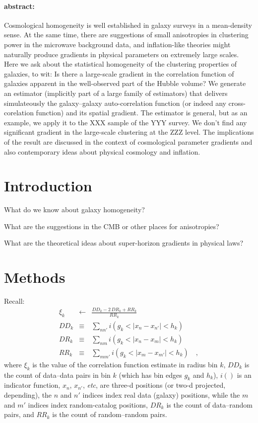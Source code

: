 \documentclass[12pt, letterpaper]{article}
\newcommand{\foreign}[1]{\textsl{#1}}
\newcommand{\etc}{\foreign{etc}}
\begin{document}
\paragraph{abstract:}
Cosmological homogeneity is well established in galaxy surveys in a mean-density
sense.
At the same time, there are suggestions of small anisotropies in clustering power in
the microwave background data, and inflation-like theories might naturally produce
gradients in physical parameters on extremely large scales.
Here we ask about the statistical homogeneity of the clustering properties of galaxies,
to wit:
Is there a large-scale gradient in the correlation function of galaxies
apparent in the well-observed part of the Hubble volume?
We generate an estimator (implicitly part of a large family of estimators)
that delivers simulateously the galaxy--galaxy auto-correlation function
(or indeed any cross-corelation function)
and its spatial gradient.
The estimator is general, but as an example,
we apply it to the XXX sample of the YYY survey.
We don't find any significant gradient in the large-scale clustering at the ZZZ level.
The implications of the result are discussed in the context of cosmological parameter
gradients and also contemporary ideas about physical cosmology and inflation.

\section{Introduction}

What do we know about galaxy homogeneity?

What are the suggestions in the CMB or other places for anisotropies?

What are the theoretical ideas about super-horizon gradients in physical laws?

\section{Methods}

Recall:
\begin{eqnarray}\displaystyle
\xi_k &\leftarrow& \frac{DD_k - 2\,DR_k + RR_k}{RR_k}
\\
DD_k &\equiv& \sum_{n n'} i(g_k < |x_n - x_{n'}| < h_k)
\\
DR_k &\equiv& \sum_{n m} i(g_k < |x_n - x_m| < h_k)
\\
RR_k &\equiv& \sum_{m m'} i(g_k < |x_m - x_{m'}| < h_k)
\quad ,
\end{eqnarray}
where
$\xi_k$ is the value of the correlation function estimate in radius bin $k$,
$DD_k$ is the count of data--data pairs in bin $k$
(which has bin edges $g_k$ and $h_k$),
$i()$ is an indicator function,
$x_n$, $x_{n'}$, \etc, are three-d positions (or two-d projected, depending),
the $n$ and $n'$ indices index real data (galaxy) positions, while the $m$ and $m'$
indices index random-catalog positions,
$DR_k$ is the count of data--random pairs,
and
$RR_k$ is the count of random--random pairs.
\end{document}
